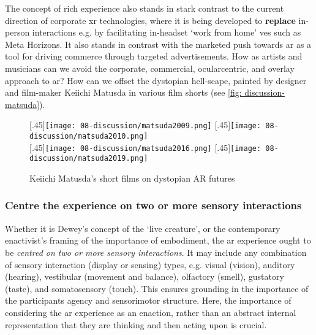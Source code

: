 The concept of rich experience also stands in stark contrast to the current direction of corporate \gls{xr} technologies, where it is being developed to \textbf{replace} in-person interactions e.g. by facilitating in-headset `work from home' \glspl{ve} such as Meta Horizons. It also stands in contrast with the marketed push towards \gls{ar} as a tool for driving commerce through targeted advertisements. How as artists and musicians can we avoid the corporate, commercial, ocularcentric, and overlay approach to \gls{ar}? How can we offset the dystopian hell-scape, painted by designer and film-maker Keiichi Matusda in various film shorts (see \autoref{fig: discussion-matsuda}).

\begin{figure}[hbt]
    \centering
    \captionsetup{justification=centering}
    [.45\linewidth]{\texttt{[image: 08-discussion/matsuda2009.png]}}
    \hfill
    [.45\linewidth]{\texttt{[image: 08-discussion/matsuda2010.png]}} \\
    \vspace{0.5cm}
    [.45\linewidth]{\texttt{[image: 08-discussion/matsuda2016.png]}}
    \hfill
    [.45\linewidth]{\texttt{[image: 08-discussion/matsuda2019.png]}}
    \caption{Keiichi Matusda's short films on dystopian AR futures}
    \label{fig: discussion-matsuda}
\end{figure}

\subsubsection{Centre the experience on two or more sensory interactions}
Whether it is Dewey's concept of the `live creature', or the contemporary enactivist's framing of the importance of embodiment, the \gls{ar} experience ought to be \textit{centred on two or more sensory interactions}. It may include any combination of sensory interaction (display or sensing) types, e.g. visual (vision), auditory (hearing), vestibular (movement and balance), olfactory (smell), gustatory (taste), and somatosensory (touch). This ensures grounding in the importance of the participants agency and sensorimotor structure. Here, the importance of considering the \gls{ar} experience as an enaction, rather than an abstract internal representation that they are thinking and then acting upon is crucial.

